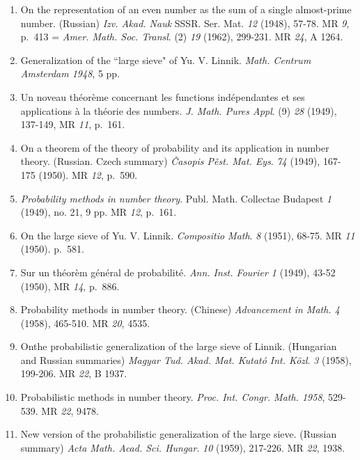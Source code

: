 \begin{thebibliography}{99}
\begin{enumerate}
\item On the representation of an even number as the sum of a single
  almost-prime number. (Russian) \textit{Izv. Akad. Nauk}
  SSSR. Ser. Mat. {\em 12} (1948), 57-78. MR {\em 9}, p.~413 =
  \textit{Amer. Math. Soc. Transl}. (2) {\em 19} (1962), 299-231. MR
         {\em 24}, A 1264. 

\item Generalization of the ``large sieve" of
  Yu. V. Linnik. \textit{Math. Centrum Amsterdam 1948}, 5 pp. 

\item Un noveau th\'eor\`eme concernant les functions ind\'ependantes
  et ses applications \`a la th\'eorie des numbers. \textit{J. Math. Pures
    Appl}. (9) {\em 28} (1949), 137-149, MR {\em 11}, p.~161. 

\item On a theorem of the theory of probability and its application in
  number theory. (Russian. Czech summary) \textit{\v{C}asopis
    P\v{e}st. Mat. Eys}. {\em 74} (1949), 167-175 (1950). MR {\em 12},
  p.~590. 

\item \textit{Probability methods in number
  theory}. Publ. Math. Collectae Budapest {\em 1} (1949), no. 21, 9
  pp. MR {\em 12}, p.~161. 

\item On the large sieve of Yu. V. Linnik. \textit{Compositio
  Math}. {\em 8} (1951), 68-75. MR {\em 11} (1950). p.~581. 

\item Sur un th\'eor\`em g\'en\'eral de
  probabilit\'e. \textit{Ann. Inst. Fourier 1} (1949), 43-52 (1950),
  MR {\em 14}, p.~886. 

\item Probability methods in number theory. (Chinese)
  \textit{Advancement in Math. 4} (1958), 465-510. MR {\em 20}, 4535. 

\item On\pageoriginale the probabilistic generalization of the large sieve of
  Linnik. (Hungarian and Russian summaries) \textit{Magyar
    Tud. Akad. Mat. Kutat\'o Int. K\"ozl}. {\em 3} (1958), 199-206. MR
  {\em 22}, B 1937. 

\item Probabilistic methods in number
  theory. \textit{Proc. Int. Congr. Math. 1958}, 529-539. MR {\em 22},
  9478. 

\item New version of the probabilistic generalization of the large
  sieve. (Russian summary) \textit{Acta
    Math. Acad. Sci. Hungar}. {\em 10} (1959), 217-226. MR {\em 22},
  1938.  
\end{enumerate}


\end{thebibliography}
